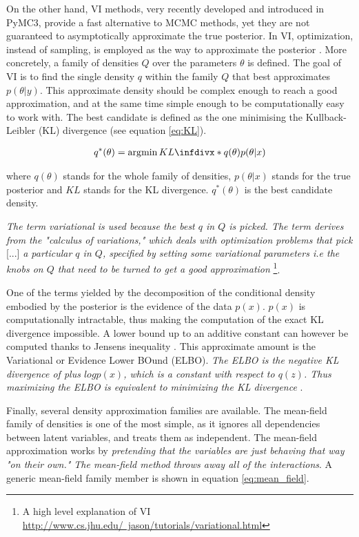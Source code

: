 On the other hand, \ac{VI} methods, very recently developed and introduced in PyMC3, provide a fast alternative to \ac{MCMC} methods, yet they are not guaranteed to asymptotically approximate the true posterior. In \ac{VI}, optimization, instead of sampling, is employed as the way to approximate the posterior \cite{Blei2017}. More concretely, a family of densities $Q$ over the parameters $\theta$ is defined. The goal of \ac{VI} is to find the single density $q$ within the family $Q$ that best approximates $p(\theta|y)$. This approximate density should be complex enough to reach a good approximation, and at the same time simple enough to be computationally easy to work with. The best candidate is defined as the one minimising the Kullback-Leibler (\ac{KL}) divergence (see equation \ref{eq:KL}).

\begin{gather}\label{eq:KL}
q^*(\theta) = \argmin \infdiv*{q(\theta)}{p(\theta|x)}
\end{gather}

where $q(\theta)$ stands for the whole family of densities, $p(\theta|x)$ stands for the true posterior and $KL$ stands for the \ac{KL} divergence. $q^*(\theta)$ is the best candidate density.

\textit{The term variational is used because the best $q$ in $Q$ is picked. The term derives from the "calculus of variations," which deals with optimization problems that pick} [...] \textit{a particular $q$ in $Q$, specified by setting some variational parameters i.e the knobs on $Q$ that need to be turned to get a good approximation}  \footnote{A high level explanation of \ac{VI} \href{http://www.cs.jhu.edu/~jason/tutorials/variational.html}{http://www.cs.jhu.edu/~jason/tutorials/variational.html}\label{fn:vi}}.

One of the terms yielded by the decomposition of the conditional density embodied by the posterior is the evidence of the data $p(x)$.  $p(x)$ is computationally intractable, thus making the computation of the exact \ac{KL} divergence impossible. A lower bound up to an additive constant can however be computed thanks to Jensen\textquotesingle s inequality \cite{jensen1906fonctions}. This approximate amount is the Variational or Evidence Lower BOund (\ac{ELBO}). \textit{The \ac{ELBO} is the negative \ac{KL} divergence of plus $logp(x)$, which is a constant with respect to $q(z)$. Thus maximizing
the \ac{ELBO} is equivalent to minimizing the \ac{KL} divergence} \cite{Blei2017}.

Finally, several density approximation families are available. The mean-field family of densities is one of the most simple, as it ignores all dependencies between latent variables, and treats them as independent. The mean-field approximation works by \textit{pretending that the variables are just behaving that way "on their own." The mean-field method throws away all of the interactions}. A generic mean-field family member is shown in equation \ref{eq:mean_field}.

